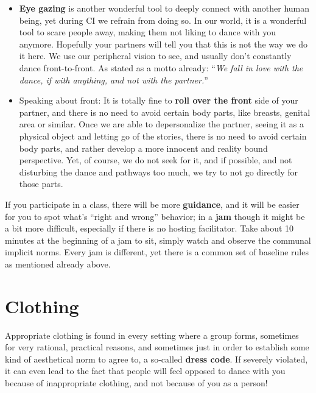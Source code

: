 \begin{itemize}
    \item \textbf{Eye gazing} is another wonderful tool to deeply connect with another human being, yet during CI we refrain from doing so.
    In our world, it is a wonderful tool to scare people away, making them not liking to dance with you anymore.
    Hopefully your partners will tell you that this is not the way we do it here.
    We use our peripheral vision to see, and usually don't constantly dance front-to-front.
    As stated as a motto already: ``\textit{We fall in love with the dance, if with anything, and not with the partner.}''
    \item Speaking about front: It is totally fine to \textbf{roll over the front} side of your partner, and there is no need to avoid certain body parts, like breasts, genital area or similar.
    Once we are able to depersonalize the partner, seeing it as a physical object and letting go of the stories, there is no need to avoid certain body parts, and rather develop a more innocent and reality bound perspective.
    Yet, of course, we do not seek for it, and if possible, and not disturbing the dance and pathways too much, we try to not go directly for those parts.
\end{itemize}

If you participate in a class, there will be more \textbf{guidance}, and it will be easier for you to spot what's ``right and wrong'' behavior; in a \textbf{jam} though it might be a bit more difficult, especially if there is no hosting facilitator.
Take about 10 minutes at the beginning of a jam to sit, simply watch and observe the communal implicit norms.
Every jam is different, yet there is a common set of baseline rules as mentioned already above.

\section{Clothing}\label{sec:clothing}

Appropriate clothing is found in every setting where a group forms, sometimes for very rational, practical reasons, and sometimes just in order to establish some kind of aesthetical norm to agree to, a so-called \textbf{dress code}.
If severely violated, it can even lead to the fact that people will feel opposed to dance with you because of inappropriate clothing, and not because of you as a person!

